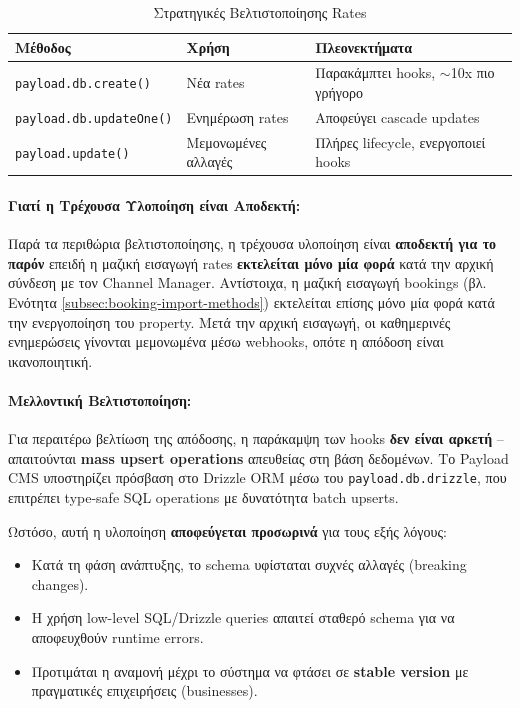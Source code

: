 \documentclass[
	12pt, %
	oneside, %
	greek,
	onehalfspacing, %
	liststotoc, %
	toctotoc, %
	parskip, %
	headsepline, %
]{MastersDoctoralThesis} %
\newcommand{\code}[1]{\texttt{#1}}
\begin{document}
\begin{table}[H]
\centering
\caption{Στρατηγικές Βελτιστοποίησης Rates}
\label{tab:rate-optimization}
\begin{tabular}{@{}lll@{}}
\toprule
\textbf{Μέθοδος} & \textbf{Χρήση} & \textbf{Πλεονεκτήματα} \\
\midrule
\code{payload.db.create()} & Νέα rates & Παρακάμπτει hooks, $\sim$10x πιο γρήγορο \\
\code{payload.db.updateOne()} & Ενημέρωση rates & Αποφεύγει cascade updates \\
\code{payload.update()} & Μεμονωμένες αλλαγές & Πλήρες lifecycle, ενεργοποιεί hooks \\
\bottomrule
\end{tabular}
\end{table}

\paragraph{Γιατί η Τρέχουσα Υλοποίηση είναι Αποδεκτή:}

Παρά τα περιθώρια βελτιστοποίησης, η τρέχουσα υλοποίηση είναι \textbf{αποδεκτή για το παρόν} επειδή η μαζική εισαγωγή rates \textbf{εκτελείται μόνο μία φορά} κατά την αρχική σύνδεση με τον Channel Manager. Αντίστοιχα, η μαζική εισαγωγή bookings (βλ. Ενότητα \ref{subsec:booking-import-methods}) εκτελείται επίσης μόνο μία φορά κατά την ενεργοποίηση του property. Μετά την αρχική εισαγωγή, οι καθημερινές ενημερώσεις γίνονται μεμονωμένα μέσω webhooks, οπότε η απόδοση είναι ικανοποιητική.

\paragraph{Μελλοντική Βελτιστοποίηση:}

Για περαιτέρω βελτίωση της απόδοσης, η παράκαμψη των hooks \textbf{δεν είναι αρκετή} -- απαιτούνται \textbf{mass upsert operations} απευθείας στη βάση δεδομένων. Το Payload CMS υποστηρίζει πρόσβαση στο Drizzle ORM μέσω του \code{payload.db.drizzle}, που επιτρέπει type-safe SQL operations με δυνατότητα batch upserts.

Ωστόσο, αυτή η υλοποίηση \textbf{αποφεύγεται προσωρινά} για τους εξής λόγους:
\begin{itemize}
    \item Κατά τη φάση ανάπτυξης, το schema υφίσταται συχνές αλλαγές (breaking changes).
    \item Η χρήση low-level SQL/Drizzle queries απαιτεί σταθερό schema για να αποφευχθούν runtime errors.
    \item Προτιμάται η αναμονή μέχρι το σύστημα να φτάσει σε \textbf{stable version} με πραγματικές επιχειρήσεις (businesses).
\end{itemize}
\end{document}
